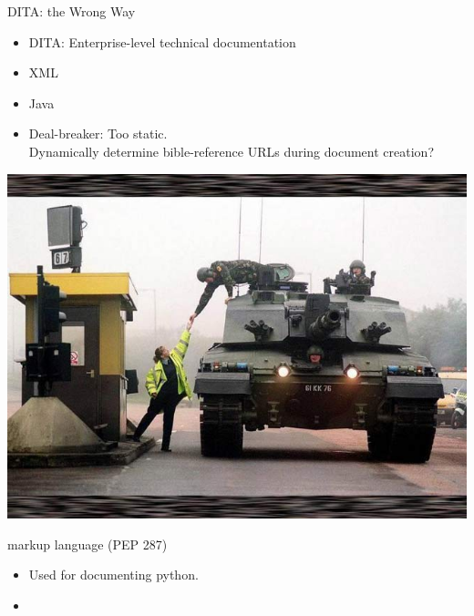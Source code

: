\documentclass{beamer}
\begin{document}
    \begin{frame}{DITA: the Wrong Way}
        \begin{itemize}
        \item DITA: Enterprise-level technical documentation
        \item XML
        \item Java
        \item Deal-breaker: Too static.\\
            Dynamically determine bible-reference URLs during document creation?
        \end{itemize}
    \end{frame}
    
    \begin{frame}[plain]
        \includegraphics[keepaspectratio=true, width=\paperwidth]{tank-toll.jpg}
    \end{frame}
    
    \begin{frame}{\rst markup language (PEP 287)}
        \begin{itemize}
        \item Used for documenting python.
        \item 
        \end{itemize}
    \end{frame}
    
    
\end{document}
